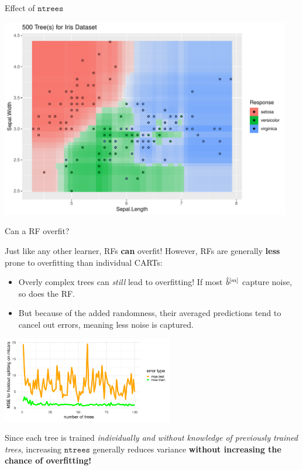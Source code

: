 \documentclass[11pt,compress,t,notes=noshow, xcolor=table]{beamer}
\begin{document}
\begin{vbframe}{Effect of $\texttt{ntrees}$}
\begin{knitrout}
{\centering \includegraphics[width=0.95\textwidth]{figure/cart_forest_intro_3} 

}
\end{knitrout}
\end{vbframe}

\begin{vbframe}{Can a RF overfit? }

{\small
Just like any other learner, RFs \textbf{can} overfit! However, RFs are generally \textbf{less} prone to overfitting than individual CARTs:
\begin{itemize}
  \item Overly complex trees can \textit{still} lead to overfitting! If most $\hat{b}^{[m]}$ capture noise, so does the RF.
  \item But because of the added randomness, their averaged predictions tend to cancel out errors, meaning less noise is captured.
\end{itemize}

\begin{center}
\includegraphics[width=0.56\textwidth]{figure/forest-overfit.png}
\end{center}

Since each tree is trained \textit{individually and without knowledge of previously trained trees}, increasing $\texttt{ntrees}$ generally reduces variance \textbf{without increasing the chance of overfitting!}
}
\end{vbframe}
\end{document}
